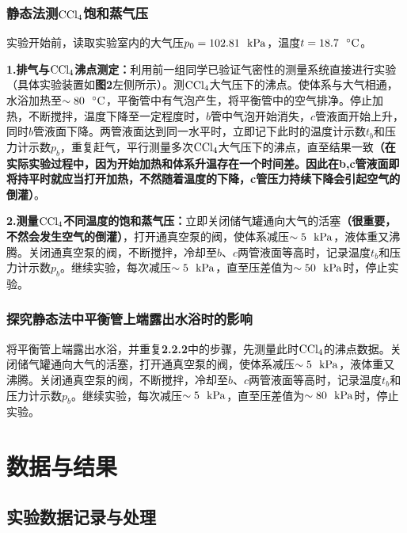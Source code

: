 \documentclass[12pt]{article}
\begin{document}
		 \subsubsection{静态法测$\rm CCl_{4}$饱和蒸气压}
		 实验开始前，读取实验室内的大气压$p_{0}=102.81\ \ {\rm kPa}$，温度$t=18.7\ \ {\rm ^{\circ}C}$。\par
		 \textbf{1.排气与$\rm CCl_{4}$沸点测定：}利用前一组同学已验证气密性的测量系统直接进行实验（具体实验装置如\textbf{图2}左侧所示）。测$\rm CCl_{4}$大气压下的沸点。使体系与大气相通，水浴加热至$\sim 80\ \ {\rm ^{\circ}C}$，平衡管中有气泡产生，将平衡管中的空气排净。停止加热，不断搅拌，温度下降至一定程度时，$b$管中气泡开始消失，$c$管液面开始上升，同时$b$管液面下降。两管液面达到同一水平时，立即记下此时的温度计示数$t_{b}$和压力计示数$p_{b}$，重复赶气，平行测量多次$\rm CCl_{4}$大气压下的沸点，直至结果一致\textbf{（在实际实验过程中，因为开始加热和体系升温存在一个时间差。因此在b,c管液面即将持平时就应当打开加热，不然随着温度的下降，c管压力持续下降会引起空气的倒灌）}。\par 
		 \textbf{2.测量$\rm CCl_{4}$不同温度的饱和蒸气压：}立即关闭储气罐通向大气的活塞\textbf{（很重要，不然会发生空气的倒灌）}，打开通真空泵的阀，使体系减压$\sim 5\ \ {\rm kPa}$，液体重又沸腾。关闭通真空泵的阀，不断搅拌，冷却至$b$、$c$两管液面等高时，记录温度$t_{b}$和压力计示数$p_{b}$。继续实验，每次减压$\sim 5\ \ {\rm kPa}$，直至压差值为$\sim 50\ \ {\rm kPa}$时，停止实验。\par
		\subsubsection{探究静态法中平衡管上端露出水浴时的影响}
			将平衡管上端露出水浴，并重复\textbf{2.2.2}中的步骤，先测量此时$\rm CCl_{4}$的沸点数据。关闭储气罐通向大气的活塞，打开通真空泵的阀，使体系减压$\sim 5\ \ {\rm kPa}$，液体重又沸腾。关闭通真空泵的阀，不断搅拌，冷却至$b$、$c$两管液面等高时，记录温度$t_{b}$和压力计示数$p_{b}$。继续实验，每次减压$\sim 5\ \ {\rm kPa}$，直至压差值为$\sim 80\ \ {\rm kPa}$时，停止实验。\par
			
	
	 \section{数据与结果}
 		\subsection{实验数据记录与处理}
\end{document}
